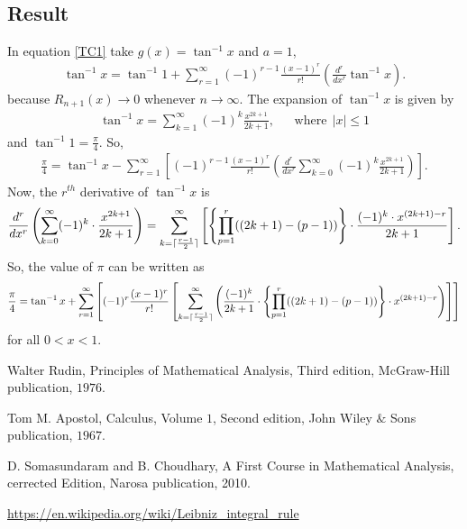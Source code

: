 \documentclass{amsart}
\DeclarePairedDelimiter\ceil{\lceil}{\rceil}
\theoremstyle{definition}
\theoremstyle{remark}
\numberwithin{equation}{section}
\begin{document}
\subsection{Result}
In equation \eqref{TC1} take $g(x)=\tan ^{-1}x $ and $a=1$,
\begin{eqnarray*}
\tan ^{-1}x = \tan ^{-1}1 + \sum_{r=1}^{\infty} (-1)^{r-1} \frac{(x-1)^r}{r!} \left(  \frac{d^{r}}{dx^{r}} \tan ^{-1}x \right).
\end{eqnarray*}
because $R_{n+1}(x) \rightarrow 0$ whenever $n \rightarrow \infty$.
The expansion of $\tan ^{-1}x $ is given by
\begin{eqnarray*}
\tan ^{-1} x = \sum_{k=1}^{\infty} (-1)^{k} \frac{x^{2k+1}}{2k+1},~~~~~~~ \textrm{where}~~ |x| \leq 1
\end{eqnarray*}
and $\tan ^{-1}1 = \frac{\pi}{4}$. So,
\begin{eqnarray*}
\frac{\pi}{4} = \tan ^{-1}x - \sum_{r=1}^{\infty} \left[ (-1)^{r-1} \frac{(x-1)^r}{r!} \left( \frac{d^r}{dx^r} \sum_{k=0}^{\infty} (-1)^{k} \frac{x^{2k+1}}{2k+1} \right) \right].
\end{eqnarray*}
Now, the $r^{th}$ derivative of $\tan ^{-1} x$ is
\begin{eqnarray*}
\frac{d^{r}}{dx^{r}} \left( \sum_{k=0}^{\infty} (-1)^{k} \cdot \frac{x^{2k+1}}{2k+1} \right) = \sum_{k=\ceil{\frac{r-1}{2}}}^{\infty} \left[ \left\{ \prod_{p=1}^{r} ((2k+1)-(p-1)) \right\} \cdot \frac{(-1)^k \cdot x^{(2k+1)-r}}{2k+1} \right].
\end{eqnarray*}
So, the value of $\pi$ can be written as
\begin{eqnarray*}
\frac{\pi}{4} =  \tan ^{-1} x + \sum_{r=1}^{\infty} \left[ (-1)^r \frac{(x-1)^r}{r!} \left[ \sum_{k=\ceil{\frac{r-1}{2}}}^{\infty} \left( \frac{(-1)^k}{2k+1}  \cdot \left\{ \prod_{p=1}^{r} ((2k+1)-(p-1)) \right\} \cdot x^{(2k+1)-r} \right) \right] \right]
\end{eqnarray*}
for all $0<x<1$.



\begin{thebibliography}{10}

 Walter Rudin, Principles of Mathematical Analysis, Third edition, McGraw-Hill publication, $1976$.

 Tom M. Apostol, Calculus, Volume $1$, Second edition, John Wiley $\&$ Sons publication, $1967$.

 D. Somasundaram and B. Choudhary, A First Course in Mathematical Analysis, cerrected Edition, Narosa publication, 2010.

 \url{https://en.wikipedia.org/wiki/Leibniz\_integral\_rule}

\end{thebibliography}
\end{document}

